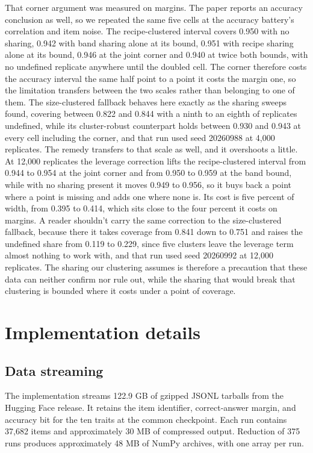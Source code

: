 That corner argument was measured on margins. The paper reports an accuracy conclusion as well, so we repeated the same five cells at the accuracy battery's correlation and item noise. The recipe-clustered interval covers 0.950 with no sharing, 0.942 with band sharing alone at its bound, 0.951 with recipe sharing alone at its bound, 0.946 at the joint corner and 0.940 at twice both bounds, with no undefined replicate anywhere until the doubled cell. The corner therefore costs the accuracy interval the same half point to a point it costs the margin one, so the limitation transfers between the two scales rather than belonging to one of them. The size-clustered fallback behaves here exactly as the sharing sweeps found, covering between 0.822 and 0.844 with a ninth to an eighth of replicates undefined, while its cluster-robust counterpart holds between 0.930 and 0.943 at every cell including the corner, and that run used seed 20260988 at 4,000 replicates. The remedy transfers to that scale as well, and it overshoots a little. At 12,000 replicates the leverage correction lifts the recipe-clustered interval from 0.944 to 0.954 at the joint corner and from 0.950 to 0.959 at the band bound, while with no sharing present it moves 0.949 to 0.956, so it buys back a point where a point is missing and adds one where none is. Its cost is five percent of width, from 0.395 to 0.414, which sits close to the four percent it costs on margins. A reader shouldn't carry the same correction to the size-clustered fallback, because there it takes coverage from 0.841 down to 0.751 and raises the undefined share from 0.119 to 0.229, since five clusters leave the leverage term almost nothing to work with, and that run used seed 20260992 at 12,000 replicates. The sharing our clustering assumes is therefore a precaution that these data can neither confirm nor rule out, while the sharing that would break that clustering is bounded where it costs under a point of coverage.

\section{Implementation details}
\label{app:implementation}

\subsection{Data streaming}
The implementation streams 122.9 GB of gzipped JSONL tarballs from the Hugging Face release. It retains the item identifier, correct-answer margin, and accuracy bit for the ten traits at the common checkpoint. Each run contains 37,682 items and approximately 30 MB of compressed output. Reduction of 375 runs produces approximately 48 MB of NumPy archives, with one array per run.


